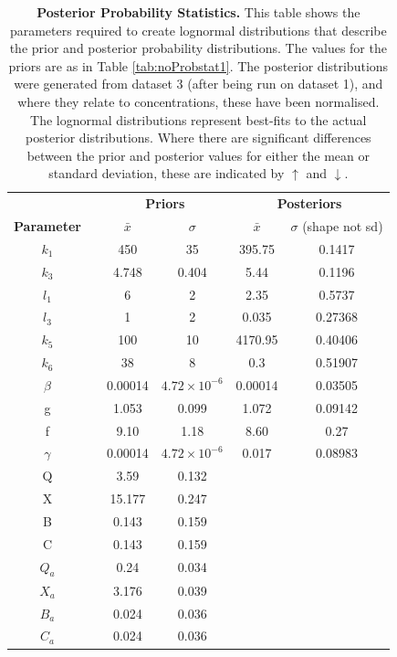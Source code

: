 \begin{table}[tbp]%
\renewcommand{\arraystretch}{1.5}
\begin{center}
\begin{tabular}{cccccc}
\toprule
& & \multicolumn{2}{c}{\textbf{Priors}} & \multicolumn{2}{c}{\textbf{Posteriors}} \\
\textbf{Parameter} && ${\bar{x}}$ & $\sigma$ & ${\bar{x}}$ & $\sigma$ (shape not sd)\\
\midrule
$k_1$ && 450 & 35 & 395.75 & 0.1417\\
$k_3$ && 4.748 & 0.404 & 5.44 & 0.1196\\
$l_1$ && 6 & 2 & 2.35 & 0.5737\\
$l_3$ && 1 & 2 & 0.035 & 0.27368\\
$k_5$ && 100 & 10 & 4170.95 & 0.40406\\
$k_6$ && 38 & 8 & 0.3 & 0.51907\\
$\beta$ && 0.00014 & $4.72\times 10^{-6}$ & 0.00014 & 0.03505\\
g && 1.053 & 0.099 & 1.072 & 0.09142\\
f && 9.10 & 1.18 & 8.60 & 0.27\\
$\gamma$ && 0.00014 & $4.72\times 10^{-6}$ & 0.017 & 0.08983\\
Q && 3.59 & 0.132 & \\
X && 15.177 & 0.247 & \\
B && 0.143 & 0.159 & \\
C && 0.143 & 0.159 & \\
$Q_a$ && 0.24 & 0.034 & \\
$X_a$ && 3.176 & 0.039 & \\
$B_a$ && 0.024 & 0.036 & \\
$C_a$ && 0.024 & 0.036 & \\
\bottomrule
\end{tabular}
\end{center}
\caption[Posterior Probability Statistics]{{\bf Posterior Probability Statistics.} This table shows the parameters required to create lognormal distributions that describe the prior and posterior probability distributions. The values for the priors are as in Table \ref{tab:noProbstat1}. The posterior distributions were generated from dataset 3 (after being run on dataset 1), and where they relate to concentrations, these have been normalised. The lognormal distributions represent best-fits to the actual posterior distributions. Where there are significant differences between the prior and posterior values for either the mean or standard deviation, these are indicated by $\uparrow$ and $\downarrow$.
\label{tab:noPstat}}
\end{table}

